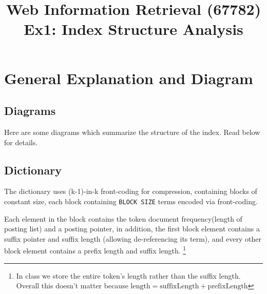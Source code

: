 \documentclass[11pt]{article}
\begin{document}
\title{Web Information Retrieval (67782)\\ Ex1: Index Structure Analysis}
\date{}

\maketitle
{}


\section{General Explanation and Diagram}

\begin{comment}
{\em This section should contain the  precise details behind the index structure that you have implemented. Your discussion should be very specific and should allow the reader to precisely understand the format of your index files, stored on disk. Provide a diagram that depicts the structure of the index. }
\end{comment}


\subsection{Diagrams}

Here are some diagrams which summarize the structure of the index. Read below for details.





\subsection{Dictionary}

The dictionary uses (k-1)-in-k front-coding for compression, containing blocks of constant size, each block containing \verb+BLOCK SIZE+ terms
encoded via front-coding.

Each element in the block contains the token document frequency(length of posting list) and a posting pointer, in addition, the first block element
contains a suffix pointer and suffix length (allowing de-referencing its term), and every other block element contains a prefix length and suffix length. \footnote{In class we store the entire token's length rather than the suffix length. Overall this doesn't matter because 
	$\text{length} = \text{suffixLength} + \text{prefixLength}$}
\end{document}
